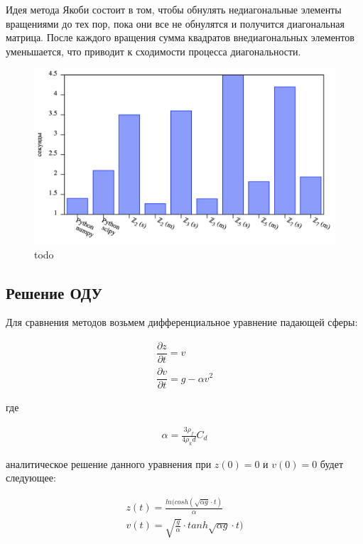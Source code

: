 \documentclass[master, och, diploma, times]{sty/SCWorks}
\theoremstyle{plain}
\theoremstyle{definition}
\begin{document}
Идея метода Якоби состоит в том, чтобы обнулять недиагональные элементы вращениями до тех пор, пока они все не обнулятся и получится диагональная матрица. После каждого вращения сумма квадратов внедиагональных элементов уменьшается, что приводит к сходимости процесса диагональности. 


\begin{figure}[H]
\centerline{\includegraphics[width=0.85\linewidth]{../gnuplot/comp/jacoby/plot.png}}
\caption{todo}
\end{figure}

\subsection{Решение ОДУ}
Для сравнения методов возьмем дифференциальное уравнение падающей сферы:

\begin{equation}
\begin{aligned}
\dfrac{\partial z}{ \partial t} = v \\
\dfrac{\partial v}{ \partial t} = g - \alpha v^2
\end{aligned}
\end{equation}

\noindent где

\begin{equation}
\begin{aligned}
\alpha = \frac{3\rho_f}{4\rho_k d}C_d
\end{aligned}
\end{equation}

\noindent аналитическое решение данного уравнения при $z(0)=0$ и $v(0)=0$ будет следующее:

\begin{equation}
\begin{aligned}
z(t)=\frac{ln(cosh(\sqrt{\alpha g} \cdot t)}{\alpha} \\
v(t)=\sqrt{\frac{g}{\alpha}} \cdot tanh{\sqrt{\alpha g} \cdot t)}
\end{aligned}
\end{equation}
\end{document}
